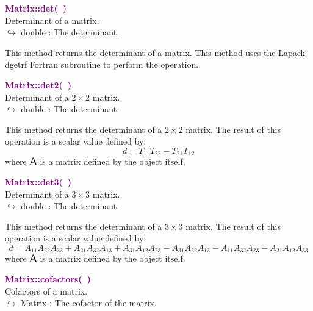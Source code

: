 \textcolor{purple}{\textbf{Matrix::det(~)}}\label{Matrix::det()}\\
Determinant of a matrix.\\ \hspace*{10mm}$\hookrightarrow$ double : The determinant.

This method returns the determinant of a matrix.
This method uses the Lapack \textsf{dgetrf} Fortran subroutine to perform the operation.

\textcolor{purple}{\textbf{Matrix::det2(~)}}\label{Matrix::det2()}\\
Determinant of a $2 \times 2$ matrix.\\ \hspace*{10mm}$\hookrightarrow$ double : The determinant.

This method returns the determinant of a $2 \times 2$ matrix.
The result of this operation is a scalar value defined by:
\begin{equation*}
d = T_{11} T_{22} - T_{21} T_{12}
\end{equation*}
where $\mbox{\large\ensuremath{\mathsf{A}}}$ is a matrix defined by the object itself.

\textcolor{purple}{\textbf{Matrix::det3(~)}}\label{Matrix::det3()}\\
Determinant of a $3 \times 3$ matrix.\\ \hspace*{10mm}$\hookrightarrow$ double : The determinant.

This method returns the determinant of a $3 \times 3$ matrix.
The result of this operation is a scalar value defined by:
\begin{equation*}
d = A_{11} A_{22} A_{33} + A_{21} A_{32} A_{13} + A_{31} A_{12} A_{23} - A_{31} A_{22} A_{13} - A_{11} A_{32} A_{23} - A_{21} A_{12} A_{33}
\end{equation*}
where $\mbox{\large\ensuremath{\mathsf{A}}}$ is a matrix defined by the object itself.

\textcolor{purple}{\textbf{Matrix::cofactors(~)}}\label{Matrix::cofactors()}\\
Cofactors of a matrix.\\ \hspace*{10mm}$\hookrightarrow$ Matrix : The cofactor of the matrix.

